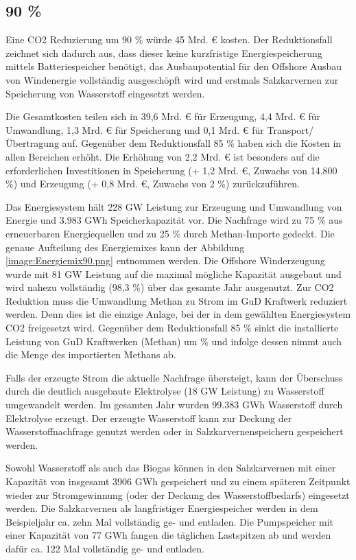 \subsection{90 \%}
Eine CO2 Reduzierung um 90 \% würde 45 Mrd. € kosten. Der Reduktionsfall zeichnet sich dadurch aus, dass dieser keine kurzfristige Energiespeicherung mittels Batteriespeicher benötigt, das Ausbaupotential für den Offshore Ausbau von Windenergie vollständig ausgeschöpft wird und erstmals Salzkarvernen zur Speicherung von Wasserstoff eingesetzt werden.

Die Gesamtkosten teilen sich in 39,6 Mrd. € für Erzeugung, 4,4 Mrd. € für Umwandlung, 1,3 Mrd. € für Speicherung und 0,1 Mrd. € für Transport/Übertragung auf. Gegenüber dem Reduktionsfall 85 \% haben sich die Kosten in allen Bereichen erhöht. Die Erhöhung von 2,2 Mrd. € ist besonders auf die erforderlichen Investitionen in Speicherung (+ 1,2 Mrd. €, Zuwachs von 14.800 \%) und Erzeugung (+ 0,8 Mrd. €, Zuwachs von 2 \%) zurückzuführen.

Das Energiesystem hält 228 GW Leistung zur Erzeugung und Umwandlung von Energie und 3.983 GWh Speicherkapazität vor. Die Nachfrage wird zu 75 \% aus erneuerbaren Energiequellen und zu 25 \% durch Methan-Importe gedeckt. Die genaue Aufteilung des Energiemixes kann der Abbildung \ref{image:Energiemix90.png} entnommen werden. Die Offshore Winderzeugung wurde mit 81 GW Leistung auf die maximal mögliche Kapazität ausgebaut und wird nahezu vollständig (98,3 \%) über das gesamte Jahr ausgenutzt. 
Zur CO2 Reduktion muss die Umwandlung Methan zu Strom im GuD Kraftwerk reduziert werden. Denn dies ist die einzige Anlage, bei der in dem gewählten Energiesystem CO2 freigesetzt wird. Gegenüber dem Reduktionsfall 85 \% sinkt die installierte Leistung von GuD Kraftwerken (Methan) um  \% und infolge dessen nimmt auch die Menge des importierten Methans ab.


Falls der erzeugte Strom die aktuelle Nachfrage übersteigt, kann der Überschuss durch die deutlich ausgebaute Elektrolyse (18 GW Leistung) zu Wasserstoff umgewandelt werden. Im gesamten Jahr wurden 99.383 GWh Wasserstoff durch Elektrolyse erzeugt. Der erzeugte Wasserstoff kann zur Deckung der Wasserstoffnachfrage genutzt werden oder in Salzkarvernenspeichern gespeichert werden. 

Sowohl Wasserstoff als auch das Biogas können in den Salzkarvernen mit einer Kapazität von insgesamt 3906 GWh gespeichert und zu einem späteren Zeitpunkt wieder zur Stromgewinnung (oder der Deckung des Wasserstoffbedarfs) eingesetzt werden. Die Salzkarvernen als langfristiger Energiespeicher werden in dem Beispieljahr ca. zehn Mal vollständig ge- und entladen. Die Pumpspeicher mit einer Kapazität von 77 GWh fangen die täglichen Lastspitzen ab und werden dafür ca. 122 Mal vollständig ge- und entladen.

